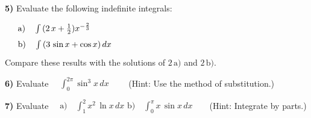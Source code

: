 \documentclass[11pt]{article}
\begin{document}
\textbf{5)} Evaluate the following indefinite integrals:

$\begin{array}{l}
   \quad \mbox{a)}\quad \int\,(2\,x + \frac{1}{2}) x^{-\frac{2}{3}} \vspace*{.25cm}\\
   \quad \mbox{b)}\quad \int\,(3\,\sin x + \cos x)\,dx\vspace*{.25cm}\\
\end{array}$ \\
\hspace*{4.5mm} Compare these results with the solutions of $2\, \mbox{a)}$ and $2\, \mbox{b)}$. \vs

\textbf{6)} Evaluate $\quad \int_{0}^{2\pi} \sin^{3} x \, dx \qquad$ (Hint: Use the method of substitution.) \vs

\textbf{7)} Evaluate $\quad \mbox{a)} \quad \int_{1}^{2} x^{2}\,\ln x \, dx$\hspace*{1cm}
$\mbox{b)}\quad \int_{0}^{\pi} x \, \sin x \, dx \qquad $(Hint: Integrate by parts.)
\end{document}
